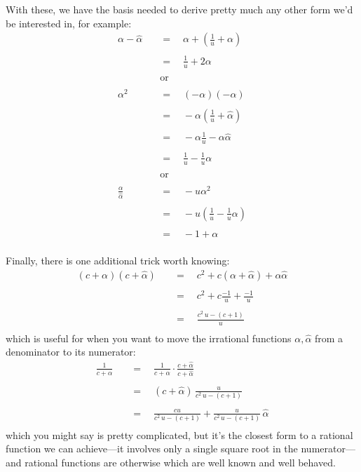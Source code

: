 \documentclass[twoside]{article}
\newcommand{\equals}{\ensuremath{\quad =\quad}}
\newcommand{\alphahat}{\ensuremath{\hat{\alpha}}}
\begin{document}
With these, we have the basis needed to derive pretty much any other form we'd be interested in, for example:
\begin{align*}
\alpha-\alphahat		& \equals \alpha+\left(\frac{1}{u}+\alpha\right)		\\
												\\
				& \equals \frac{1}{u}+2\alpha					\\
												\\
				& \quad\mbox{or}						\\
												\\
\alpha^2			& \equals (-\alpha)(-\alpha)					\\
												\\
				& \equals -\alpha\left(\frac{1}{u}+\alphahat\right)		\\
												\\
				& \equals -\alpha\frac{1}{u}-\alpha\alphahat			\\
												\\
				& \equals \frac{1}{u}-\frac{1}{u}\alpha				\\
												\\
				& \quad\mbox{or}						\\
												\\
\frac{\alpha}{\alphahat}	& \equals -u\alpha^2						\\
												\\
				& \equals -u\left(\frac{1}{u}-\frac{1}{u}\alpha\right)		\\
												\\
				& \equals -1+\alpha						\\
\end{align*}

Finally, there is one additional trick worth knowing:
\begin{align*}
(c+\alpha)(c+\alphahat)	& \equals c^2+c(\alpha+\alphahat)+\alpha\alphahat		\\
											\\
			& \equals c^2+c\frac{-1}{u}+\frac{-1}{u}			\\
											\\
			& \equals \frac{c^2\,u-(c+1)}{u}				\\
\end{align*}
which is useful for when you want to move the irrational functions $ \alpha, \alphahat $ from a denominator to its numerator:
\begin{align*}
\frac{1}{c+\alpha}	& \equals \frac{1}{c+\alpha} \cdot \frac{c+\alphahat}{c+\alphahat}		\\
													\\
			& \equals (c+\alphahat)\,\frac{u}{c^2\,u-(c+1)}					\\
													\\
			& \equals \frac{cu}{c^2\,u-(c+1)}+\frac{u}{c^2\,u-(c+1)}\,\alphahat		\\
\end{align*}
which you might say is pretty complicated, but it's the closest form to a rational function we can achieve---it involves
only a single square root in the numerator---and rational functions are otherwise which are well known and well behaved.
\end{document}
